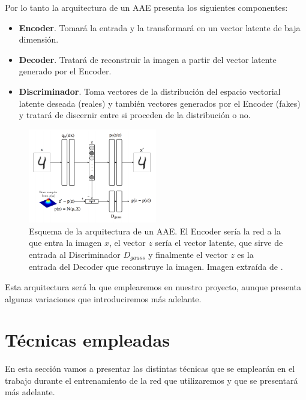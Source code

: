             \medskip

            \noindent Por lo tanto la arquitectura de un AAE presenta los siguientes componentes: 

            \begin{itemize}
                \item \textbf{Encoder}. Tomará la entrada y la transformará en un vector latente de baja dimensión.
                \item \textbf{Decoder}. Tratará de reconstruir la imagen a partir del vector latente generado por el Encoder. 
                \item \textbf{Discriminador}. Toma vectores de la distribución del espacio vectorial latente deseada (reales) y también vectores generados por el Encoder (fakes) y tratará de discernir entre si proceden de la distribución o no.
            \end{itemize}

            \begin{figure}[!h]
                \centering
                \includegraphics[width=0.5\textwidth]{img/AAE.png}
                \caption{Esquema de la arquitectura de un AAE. El Encoder sería la red a la que entra la imagen $x$, el vector $z$ sería el vector latente, que sirve de entrada al Discriminador $D_{gauss}$ y finalmente el vector $z$ es la entrada del Decoder que reconstruye la imagen. Imagen extraída de \cite{AAE}.}
                \label{fig:AAE}
            \end{figure}

            \noindent Esta arquitectura será la que emplearemos en nuestro proyecto, aunque presenta algunas variaciones que introduciremos más adelante.

\section{Técnicas empleadas}
    \noindent En esta sección vamos a presentar las distintas técnicas que se emplearán en el trabajo durante el entrenamiento de la red que utilizaremos y que se presentará más adelante. 

